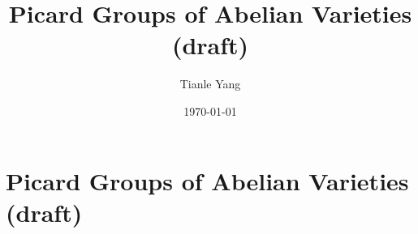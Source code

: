 \documentclass{noteformyself}
\title{Picard Groups of Abelian Varieties (draft)}
\author{Tianle Yang}
\date{\today}
\begin{document}
    \maketitle

    \section{Picard Groups of Abelian Varieties (draft)}


\end{document}
